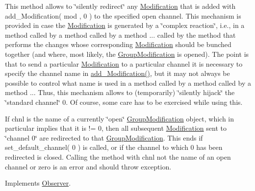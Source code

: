 This method allows to \char`\"{}silently redirect\char`\"{} any \mbox{\hyperlink{class_s_m_spp__di__unipi__it_1_1_modification}{Modification}} that is added with add\+\_\+\+Modification( mod , 0 ) to the specified open channel. This mechanism is provided in case the \mbox{\hyperlink{class_s_m_spp__di__unipi__it_1_1_modification}{Modification}} is generated by a \char`\"{}complex reaction\char`\"{}, i.\+e., in a method called by a method called by a method ... called by the method that performs the changes whose corresponding \mbox{\hyperlink{class_s_m_spp__di__unipi__it_1_1_modification}{Modification}} should be bunched together (and where, most likely, the \mbox{\hyperlink{class_s_m_spp__di__unipi__it_1_1_group_modification}{Group\+Modification}} is opened). The point is that to send a particular \mbox{\hyperlink{class_s_m_spp__di__unipi__it_1_1_modification}{Modification}} to a particular channel it is necessary to specify the channel name in \mbox{\hyperlink{class_s_m_spp__di__unipi__it_1_1_block_a9b94536a10555dfb680e015fcb4787a8}{add\+\_\+\+Modification()}}, but it may not always be possible to control what name is used in a method called by a method called by a method ... Thus, this mechanism allows to (temporarily) \char`\"{}silently hijack\char`\"{} the \char`\"{}standard channel\char`\"{} 0. Of course, some care has to be exercised while using this.

If chnl is the name of a currently \char`\"{}open\char`\"{} \mbox{\hyperlink{class_s_m_spp__di__unipi__it_1_1_group_modification}{Group\+Modification}} object, which in particular implies that it is != 0, then all subsequent \mbox{\hyperlink{class_s_m_spp__di__unipi__it_1_1_modification}{Modification}} sent to \char`\"{}channel 0\char`\"{} are redirected to that \mbox{\hyperlink{class_s_m_spp__di__unipi__it_1_1_group_modification}{Group\+Modification}}. This ends if set\+\_\+default\+\_\+channel( 0 ) is called, or if the channel to which 0 has been redirected is closed. Calling the method with chnl not the name of an open channel or zero is an error and should throw exception. 

Implements \mbox{\hyperlink{class_s_m_spp__di__unipi__it_1_1_observer_a47f7642288d3e09ad9c792f86797840d}{Observer}}.

\mbox{\label{class_s_m_spp__di__unipi__it_1_1_block_a11eb0629a8dc10c24ec9c71e48aa7a26}} 
